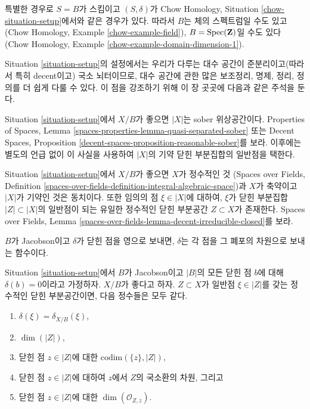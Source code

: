 \noindent
특별한 경우로 $S = B$가 스킴이고 $(S, \delta)$가
Chow Homology, Situation \ref{chow-situation-setup}에서와 같은 경우가 있다.
따라서 $B$는 체의 스펙트럼일 수도 있고
(Chow Homology, Example \ref{chow-example-field}),
$B = \mathop{\mathrm{Spec}}(\mathbf{Z})$일 수도 있다
(Chow Homology, Example \ref{chow-example-domain-dimension-1}).

\medskip\noindent
Situation \ref{situation-setup}의 설정에서는 우리가 다루는 대수 공간이
준분리이고(따라서 특히 decent이고) 국소 뇌터이므로, 대수 공간에 관한
많은 보조정리, 명제, 정리, 정의를 더 쉽게 다룰 수 있다. 이 점을
강조하기 위해 이 장 곳곳에 다음과 같은 주석을 둔다.

\begin{remark}
\label{remark-sober}
Situation \ref{situation-setup}에서 $X/B$가 좋으면 $|X|$는 sober
위상공간이다. Properties of Spaces, Lemma
\ref{spaces-properties-lemma-quasi-separated-sober} 또는
Decent Spaces, Proposition
\ref{decent-spaces-proposition-reasonable-sober}를 보라.
이후에는 별도의 언급 없이 이 사실을 사용하여 $|X|$의 기약 닫힌 부분집합의
일반점을 택한다.
\end{remark}

\begin{remark}
\label{remark-integral}
Situation \ref{situation-setup}에서 $X/B$가 좋으면 $X$가 정수적인 것
(Spaces over Fields, Definition
\ref{spaces-over-fields-definition-integral-algebraic-space})과
$X$가 축약이고 $|X|$가 기약인 것은 동치이다. 또한 임의의 점
$\xi \in |X|$에 대하여, $\xi$가 닫힌 부분집합 $|Z| \subset |X|$의
일반점이 되는 유일한 정수적인 닫힌 부분공간 $Z \subset X$가 존재한다.
Spaces over Fields, Lemma
\ref{spaces-over-fields-lemma-decent-irreducible-closed}를 보라.
\end{remark}

\noindent
$B$가 Jacobson이고 $\delta$가 닫힌 점을 영으로 보내면, $\delta$는
각 점을 그 폐포의 차원으로 보내는 함수이다.

\begin{lemma}
\label{lemma-delta-is-dimension}
Situation \ref{situation-setup}에서 $B$가 Jacobson이고 $|B|$의 모든
닫힌 점 $b$에 대해 $\delta(b) = 0$이라고 가정하자. $X/B$가 좋다고 하자.
$Z \subset X$가 일반점 $\xi \in |Z|$를 갖는 정수적인 닫힌 부분공간이면,
다음 정수들은 모두 같다.
\begin{enumerate}
\item $\delta(\xi) = \delta_{X/B}(\xi)$,
\item $\dim(|Z|)$,
\item 닫힌 점 $z \in |Z|$에 대한 $\text{codim}(\{z\}, |Z|)$,
\item 닫힌 점 $z \in |Z|$에 대하여 $z$에서 $Z$의 국소환의 차원, 그리고
\item 닫힌 점 $z \in |Z|$에 대한 $\dim(\mathcal{O}_{Z, \overline{z}})$.
\end{enumerate}
\end{lemma}


